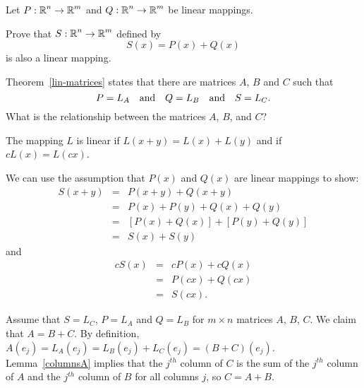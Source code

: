 \documentclass{ximera}
\begin{document}
\begin{exercise}  \label{c4.3.12}
Let $P:\mbox{$\Bbb{R}$}^n\to\mbox{$\Bbb{R}$}^m$ and $Q:\mbox{$\Bbb{R}$}^n\to\mbox{$\Bbb{R}$}^m$ be linear mappings. 
\begin{enumeratea}
\item Prove that $S:\mbox{$\Bbb{R}$}^n\to\mbox{$\Bbb{R}$}^m$ defined by
\[
S(x) = P(x) + Q(x)
\]
is also a linear mapping.  
\item Theorem~\ref{lin-matrices} states that there are matrices $A$, $B$ and $C$ such that
\[
P = L_A \quad\mbox{and}\quad Q = L_B \quad\mbox{and}\quad S = L_C .
\]
What is the relationship between the matrices $A$, $B$, and $C$?
\end{enumeratea}

\begin{solution}

\soln The mapping $L$ is linear if $L(x + y) = L(x) + L(y)$ and if $cL(x) = L(cx)$.  
\begin{enumeratea}
\item We can use the assumption that $P(x)$ and $Q(x)$ are linear mappings to show:
\[ 
\begin{array}{rcl}
S(x + y) & = & P(x + y) + Q(x + y) \\
& = & P(x) + P(y) + Q(x) + Q(y) \\
& = & [P(x) + Q(x)] + [P(y) + Q(y)] \\
& = & S(x) + S(y) 
\end{array} 
\]
and
\[ 
\begin{array}{rcl}
cS(x) & = & cP(x) + cQ(x) \\
& = & P(cx) + Q(cx) \\
& = & S(cx). 
\end{array} 
\]

\item Assume that $S = L_C$, $P = L_A$ and $Q = L_B$ for
$m \times n$ matrices $A$, $B$, $C$.  We claim that
$A = B + C$.  By definition, $A(e_j) = L_A(e_j) =  L_B(e_j) + L_C(e_j) = (B+C)(e_j)$.  
Lemma~\ref{columnsA} implies that the $j^{th}$ column of 
$C$ is the sum of the $j^{th}$ column of $A$  and the $j^{th}$ column of $B$ 
for all columns $j$, so $C = A + B$.
\end{enumeratea}
\end{solution}
\end{exercise}
\end{document}
